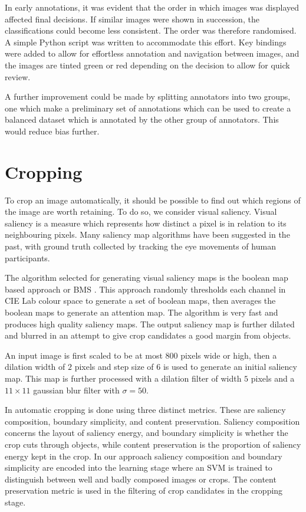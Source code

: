 In early annotations, it was evident that the order in which images was
displayed affected final decisions.
If similar images were shown in succession, the classifications could become
less consistent.
The order was therefore randomised.
A simple Python script was written to accommodate this effort.
Key bindings were added to allow for effortless annotation and navigation
between images, and the images are tinted green or red depending on the decision
to allow for quick review.

A further improvement could be made by splitting annotators into two groups, one
which make a preliminary set of annotations which can be used to create a
balanced dataset which is annotated by the other group of annotators.
This would reduce bias further.

\section{Cropping\label{sec:method_cropping}}

To crop an image automatically, it should be possible to find out which regions
of the image are worth retaining.
To do so, we consider visual saliency.
Visual saliency is a measure which represents how distinct a pixel is in
relation to its neighbouring pixels.
Many saliency map algorithms have been suggested in the past, with ground truth
collected by tracking the eye movements of human participants.

The algorithm selected for generating visual saliency maps is the boolean map
based approach or BMS \cite{zhang2013saliency}.
This approach randomly thresholds each channel in CIE Lab colour space to
generate a set of boolean maps, then averages the boolean maps to generate an
attention map.
The algorithm is very fast and produces high quality saliency maps.
The output saliency map is further dilated and blurred in an attempt to give
crop candidates a good margin from objects.

An input image is first scaled to be at most 800 pixels wide or high, then a
dilation width of $2$ pixels and step size of $6$ is used to generate an initial
saliency map.
This map is further processed with a dilation filter of width $5$ pixels and a
$11\times11$ gaussian blur filter with $\sigma=50$.

In \cite{fang2014automatic} automatic cropping is done using three distinct metrics.
These are saliency composition, boundary simplicity, and content preservation.
Saliency composition concerns the layout of saliency energy, and boundary
simplicity is whether the crop cuts through objects, while content preservation
is the proportion of saliency energy kept in the crop.
In our approach saliency composition and boundary simplicity are encoded into
the learning stage where an SVM is trained to distinguish between well and badly
composed images or crops.
The content preservation metric is used in the filtering of crop candidates in
the cropping stage.

